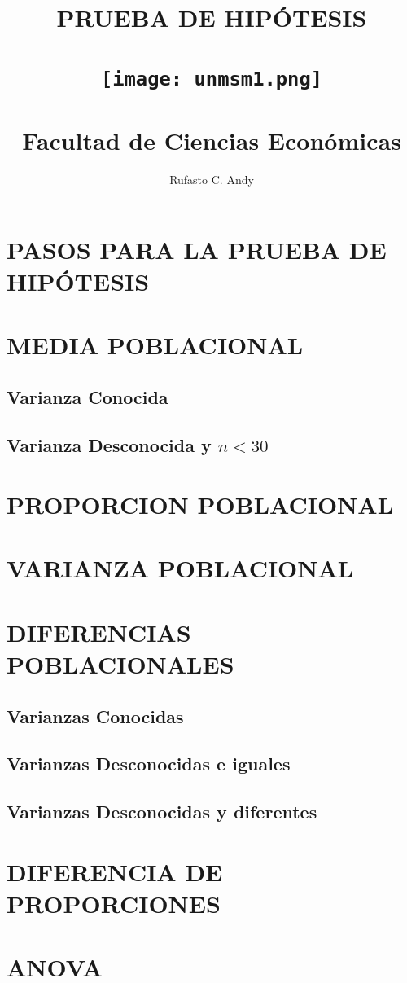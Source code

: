 \documentclass[15pt]{report}
\title{
        {\sc \bf \color{usm} PRUEBA DE HIPÓTESIS} 
        \\
        {\vfill}
        \\
        {\texttt{[image: unmsm1.png]}}
        \\
        {}
        \\
        {Facultad de Ciencias Económicas}
       }
\author{Rufasto C. Andy}
\date{}
\begin{document}
\maketitle
\begingroup
\large
\tableofcontents
\endgroup
        \begingroup
        \large

\newpage
    \chapter{\color{usm}PASOS PARA LA PRUEBA DE HIPÓTESIS}
        
    \newpage
    \chapter{\color{usm}MEDIA POBLACIONAL}
    \section{Varianza Conocida}
        
    \section{Varianza Desconocida y $n<30$}
        
        \newpage
     \chapter{\color{usm}PROPORCION POBLACIONAL}
        
     
     \chapter{\color{usm}VARIANZA POBLACIONAL}
        
        \newpage
    \chapter{\color{usm} DIFERENCIAS POBLACIONALES}
        \section{Varianzas Conocidas}
            
        \section{Varianzas Desconocidas e iguales}
            
            \newpage
        \section{Varianzas Desconocidas y diferentes}
            
    \chapter{\color{usm}DIFERENCIA DE PROPORCIONES}
            
            \newpage
    \chapter{\color{usm}ANOVA}
            
        \endgroup
\end{document}

